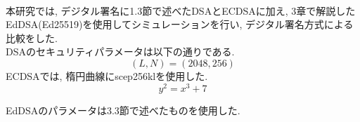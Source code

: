 \\
\indent 本研究では, デジタル署名に1.3節で述べたDSAとECDSAに加え, 
3章で解説したEdDSA(Ed25519)を使用してシミュレーションを行い, 
デジタル署名方式による比較をした. \\ 
\indent DSAのセキュリティパラメータは以下の通りである. \\
\[
  (L,N)=(2048,256)
\]
\indent ECDSAでは, 楕円曲線にscep256klを使用した. 
\[
  y^2 = x^3 + 7 
\]


\indent EdDSAのパラメータは3.3節で述べたものを使用した.



